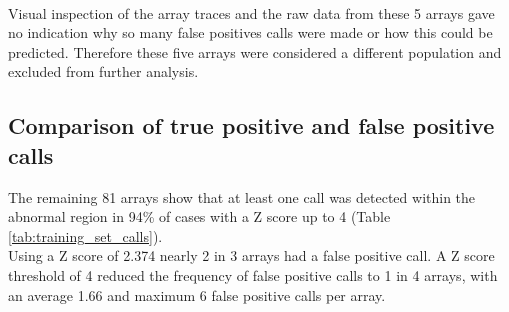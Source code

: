 \paragraph*{}
Visual inspection of the array traces and the raw data from these 5 arrays gave no indication why so many false positives calls were made or how this could be predicted. Therefore these five arrays were considered a different population and excluded from further analysis.
\subsection{Comparison of true positive and false positive calls}
\begin{table}[]
\centering
\caption[Calls made in 81 training cases after removal of outliers]{The calls made in 81 training cases using a range of Z score thresholds. The true positive call was missed in at least 5 cases across all thresholds, with a false positive call made in at least 1 in 4 cases. The number of false positive calls, and the average number of calls made decreased as the Z score threshold increased.}
\label{tab:training_set_calls}
\end{table}
The remaining 81 arrays show that at least one call was detected within the abnormal region in 94\% of cases with a Z score up to 4 (Table \ref{tab:training_set_calls}).
\\
Using a Z score of 2.374 nearly 2 in 3 arrays had a false positive call. A Z score threshold of 4 reduced the frequency of false positive calls to 1 in 4 arrays, with an average 1.66 and maximum 6 false positive calls per array.

